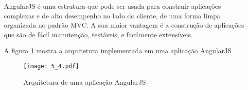 AngularJS é uma estrutura que pode ser usada para construir aplicações complexas e de alto desempenho no lado do cliente, de uma forma limpa organizada no padrão MVC. A sua maior vantagem é a construção de aplicações que são de fácil manutenção, testáveis, e facilmente extensíveis.

A figura \ref{angularjs} mostra a arquitetura implementada em uma aplicação AngularJS

\begin{figure}[H]
\centering
\texttt{[image: 5\_4.pdf]}
    \caption{Arquitetura de uma aplicação AngularJS \cite{website:angularjs}}
    \label{angularjs}%
\end{figure}




				

				
			
		


